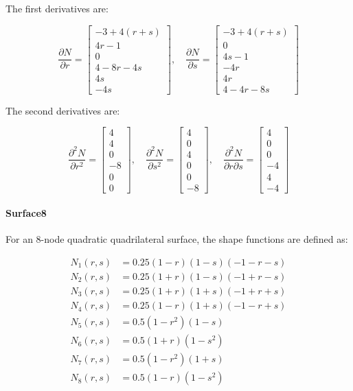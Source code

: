 The first derivatives are:

\[
\frac{\partial N}{\partial r} =
\begin{bmatrix}
-3 + 4(r + s) \\
4r - 1 \\
0 \\
4 - 8r - 4s \\
4s \\
-4s
\end{bmatrix}, \quad
\frac{\partial N}{\partial s} =
\begin{bmatrix}
-3 + 4(r + s) \\
0 \\
4s - 1 \\
-4r \\
4r \\
4 - 4r - 8s
\end{bmatrix}
\]

The second derivatives are:

\[
\frac{\partial^2 N}{\partial r^2} =
\begin{bmatrix}
4 \\
4 \\
0 \\
-8 \\
0 \\
0
\end{bmatrix}, \quad
\frac{\partial^2 N}{\partial s^2} =
\begin{bmatrix}
4 \\
0 \\
4 \\
0 \\
0 \\
-8
\end{bmatrix}, \quad
\frac{\partial^2 N}{\partial r \partial s} =
\begin{bmatrix}
4 \\
0 \\
0 \\
-4 \\
4 \\
-4
\end{bmatrix}
\]
\paragraph{Surface8} For an 8-node quadratic quadrilateral surface, the shape functions are defined as:

\[
\begin{aligned}
N_1(r, s) &= 0.25(1 - r)(1 - s)(-1 - r - s) \\
N_2(r, s) &= 0.25(1 + r)(1 - s)(-1 + r - s) \\
N_3(r, s) &= 0.25(1 + r)(1 + s)(-1 + r + s) \\
N_4(r, s) &= 0.25(1 - r)(1 + s)(-1 - r + s) \\
N_5(r, s) &= 0.5(1 - r^2)(1 - s) \\
N_6(r, s) &= 0.5(1 + r)(1 - s^2) \\
N_7(r, s) &= 0.5(1 - r^2)(1 + s) \\
N_8(r, s) &= 0.5(1 - r)(1 - s^2)
\end{aligned}
\]

